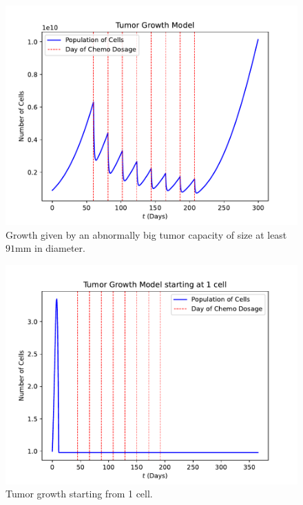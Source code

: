\documentclass[11pt]{amsart}
\begin{document}
\begin{figure}[H]
\begin{center} %
\includegraphics[scale=0.6]{./images/abnormal_growth_8T_3W.pdf} %
\end{center}
\caption{Growth given by an abnormally big tumor capacity of size at least $91$mm in diameter.}\label{fig:abnormal_growth} %
\end{figure}

\begin{figure}[H]
\begin{center} %
\includegraphics[scale=0.6]{./images/growth_1cell.pdf} %
\end{center}
\caption{Tumor growth starting from 1 cell.}\label{fig:1cellgrowth} %
\end{figure}
\end{document}
